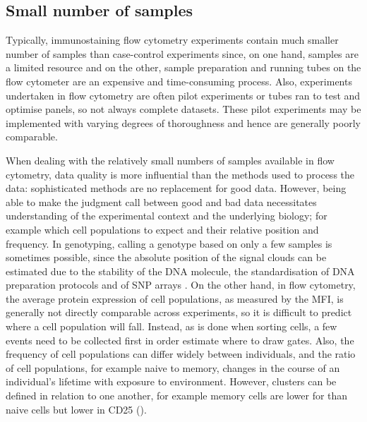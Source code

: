 \subsection{ Small number of samples }

Typically, immunostaining flow cytometry experiments contain much smaller number of samples than case-control experiments since, on one hand, samples are a limited resource and on the other, sample preparation and running tubes on the flow cytometer are an expensive and time-consuming process.
Also, experiments undertaken in flow cytometry are often pilot experiments or tubes ran to test and optimise panels, so not always complete datasets.
These pilot experiments may be implemented with varying degrees of thoroughness and hence are generally poorly comparable.

When dealing with the relatively small numbers of samples available in flow cytometry, data quality is more influential than the methods used to process the data: sophisticated methods are no replacement for good data.
However, being able to make the judgment call between good and bad data necessitates understanding of the experimental context and the underlying biology; for example which cell populations to expect and their relative position and frequency.
In genotyping, calling a genotype based on only a few samples is sometimes possible, since the absolute position of the signal clouds can be estimated due to the stability of the DNA molecule, the standardisation of DNA preparation protocols and of SNP arrays \citep{Di:2005uj,Giannoulatou:2008ty}.
On the other hand, in flow cytometry, the average protein expression of cell populations, as measured by the \gls{MFI}, is generally not directly comparable across experiments, so it is difficult to predict where a cell population will fall.
Instead, as is done when sorting cells, a few events need to be collected first in order estimate where to draw gates.
Also, the frequency of cell populations can differ widely between individuals, and the ratio of cell populations, for example naive to memory, changes in the course of an individual's lifetime with exposure to environment. 
However, clusters can be defined in relation to one another, for example memory cells are lower for  than naive cells but lower in CD25 ().

